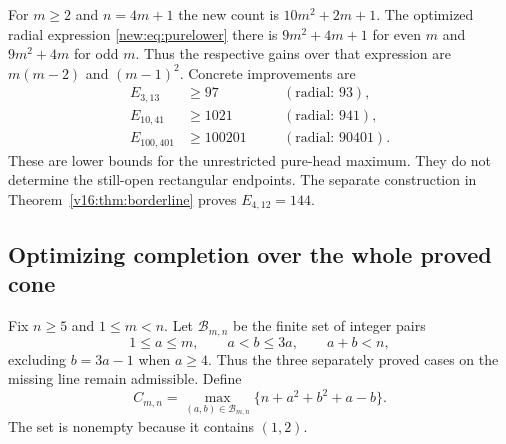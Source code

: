 \documentclass[UTF8,11pt]{ctexart}
\theoremstyle{definition}
\numberwithin{equation}{section}
\begin{document}
For $m\ge2$ and $n=4m+1$ the new count is $10m^2+2m+1$.
The optimized radial expression \eqref{new:eq:purelower} there is
$9m^2+4m+1$ for even $m$ and $9m^2+4m$ for odd $m$.
Thus the respective gains over that expression are $m(m-2)$ and
$(m-1)^2$. Concrete improvements are
\[
 \begin{aligned}
 E_{3,13}&\ge97&&\quad(\text{radial: }93),\\
 E_{10,41}&\ge1021&&\quad(\text{radial: }941),\\
 E_{100,401}&\ge100201&&\quad(\text{radial: }90401).
 \end{aligned}
\]
These are lower bounds for the unrestricted pure-head maximum.
They do not determine the still-open rectangular endpoints.
The separate construction in Theorem~\ref{v16:thm:borderline}
proves $E_{4,12}=144$.


\subsection{Optimizing completion over the whole proved cone}
\label{v8:sec:completion}

Fix $n\ge5$ and $1\le m<n$. Let $\mathcal B_{m,n}$ be the finite
set of integer pairs
\[
 1\le a\le m,\qquad a<b\le3a,\qquad a+b<n,
\]
excluding $b=3a-1$ when $a\ge4$. Thus the three separately
proved cases on the missing line remain admissible. Define
\begin{equation}\label{v8:eq:completionenvelope}
 C_{m,n}=\max_{(a,b)\in\mathcal B_{m,n}}
 \{n+a^2+b^2+a-b\}.
\end{equation}
The set is nonempty because it contains $(1,2)$.
\end{document}
